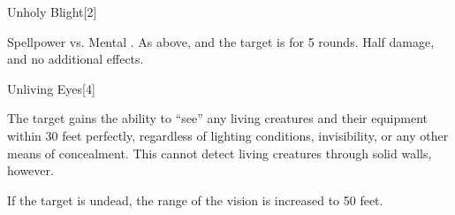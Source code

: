 \begin{spellsection}{Unholy Blight}[2]
    \begin{spellheader}
    \end{spellheader}
    \begin{spellcontent}
        \begin{spelltargetinginfo}
        \end{spelltargetinginfo}
        \begin{spelleffects}
            \begin{spellattack}{Spellpower vs. Mental}
                \spellsuccess {}.
                \spellcritical As above, and the target is \staggered for 5 rounds.
                \spellfailure Half damage, and no additional effects.
            \end{spellattack}
        \end{spelleffects}
    \end{spellcontent}
    \begin{spellfooter}
        \miscastrandom
    \end{spellfooter}
\end{spellsection}

\begin{spellsection}{Unliving Eyes}[4]
    \begin{spellheader}
    \end{spellheader}
    \begin{spellcontent}
        \begin{spelltargetinginfo}
        \end{spelltargetinginfo}
        \begin{spelleffects}
            \spelleffect The target gains the ability to ``see'' any living creatures and their equipment within 30 feet perfectly, regardless of lighting conditions, invisibility, or any other means of concealment. This cannot detect living creatures through solid walls, however.

            If the target is undead, the range of the vision is increased to 50 feet.
            \spelldur \durpersonallong
        \end{spelleffects}
    \end{spellcontent}
    \begin{spellfooter}
        \miscastexplode
    \end{spellfooter}
\end{spellsection}

